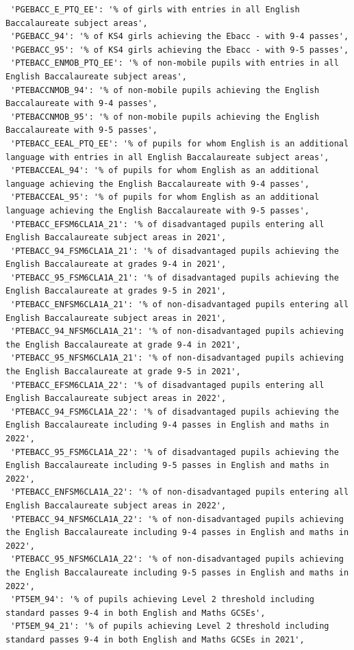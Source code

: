 \documentclass[
  letterpaper,
  DIV=11,
  numbers=noendperiod]{scrartcl}
\begin{document}
\begin{verbatim}
 'PGEBACC_E_PTQ_EE': '% of girls with entries in all English Baccalaureate subject areas',
 'PGEBACC_94': '% of KS4 girls achieving the Ebacc - with 9-4 passes',
 'PGEBACC_95': '% of KS4 girls achieving the Ebacc - with 9-5 passes',
 'PTEBACC_ENMOB_PTQ_EE': '% of non-mobile pupils with entries in all English Baccalaureate subject areas',
 'PTEBACCNMOB_94': '% of non-mobile pupils achieving the English Baccalaureate with 9-4 passes',
 'PTEBACCNMOB_95': '% of non-mobile pupils achieving the English Baccalaureate with 9-5 passes',
 'PTEBACC_EEAL_PTQ_EE': '% of pupils for whom English is an additional language with entries in all English Baccalaureate subject areas',
 'PTEBACCEAL_94': '% of pupils for whom English as an additional language achieving the English Baccalaureate with 9-4 passes',
 'PTEBACCEAL_95': '% of pupils for whom English as an additional language achieving the English Baccalaureate with 9-5 passes',
 'PTEBACC_EFSM6CLA1A_21': '% of disadvantaged pupils entering all English Baccalaureate subject areas in 2021',
 'PTEBACC_94_FSM6CLA1A_21': '% of disadvantaged pupils achieving the English Baccalaureate at grades 9-4 in 2021',
 'PTEBACC_95_FSM6CLA1A_21': '% of disadvantaged pupils achieving the English Baccalaureate at grades 9-5 in 2021',
 'PTEBACC_ENFSM6CLA1A_21': '% of non-disadvantaged pupils entering all English Baccalaureate subject areas in 2021',
 'PTEBACC_94_NFSM6CLA1A_21': '% of non-disadvantaged pupils achieving the English Baccalaureate at grade 9-4 in 2021',
 'PTEBACC_95_NFSM6CLA1A_21': '% of non-disadvantaged pupils achieving the English Baccalaureate at grade 9-5 in 2021',
 'PTEBACC_EFSM6CLA1A_22': '% of disadvantaged pupils entering all English Baccalaureate subject areas in 2022',
 'PTEBACC_94_FSM6CLA1A_22': '% of disadvantaged pupils achieving the English Baccalaureate including 9-4 passes in English and maths in 2022',
 'PTEBACC_95_FSM6CLA1A_22': '% of disadvantaged pupils achieving the English Baccalaureate including 9-5 passes in English and maths in 2022',
 'PTEBACC_ENFSM6CLA1A_22': '% of non-disadvantaged pupils entering all English Baccalaureate subject areas in 2022',
 'PTEBACC_94_NFSM6CLA1A_22': '% of non-disadvantaged pupils achieving the English Baccalaureate including 9-4 passes in English and maths in 2022',
 'PTEBACC_95_NFSM6CLA1A_22': '% of non-disadvantaged pupils achieving the English Baccalaureate including 9-5 passes in English and maths in 2022',
 'PT5EM_94': '% of pupils achieving Level 2 threshold including standard passes 9-4 in both English and Maths GCSEs',
 'PT5EM_94_21': '% of pupils achieving Level 2 threshold including standard passes 9-4 in both English and Maths GCSEs in 2021',

\end{verbatim}
\end{document}
